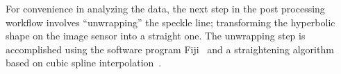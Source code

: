 For convenience in analyzing the data, the next step in the post processing
workflow involves ``unwrapping'' the speckle line; transforming the
hyperbolic shape on the image sensor into a straight one.  The unwrapping
step is accomplished using the software program
Fiji~\cite{schindelin2012fiji} and a straightening algorithm based on cubic
spline interpolation~\cite{kocsis1991image}.
